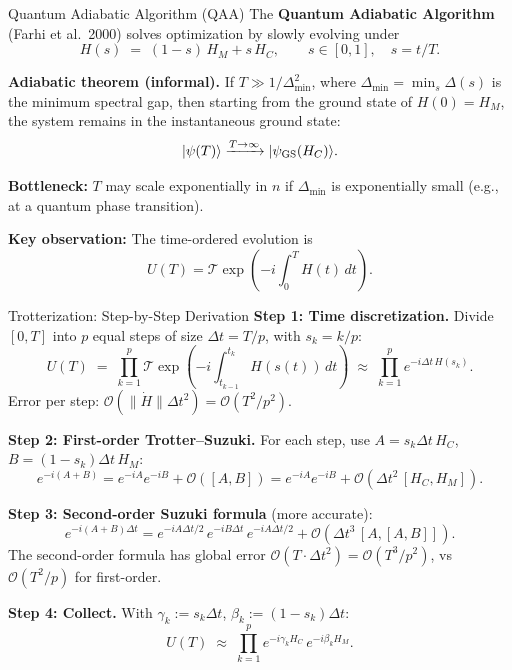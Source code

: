 \documentclass{beamer}
\begin{document}
\begin{frame}{Quantum Adiabatic Algorithm (QAA)}
The \textbf{Quantum Adiabatic Algorithm} (Farhi et al.\ 2000) solves
optimization by slowly evolving under
\[
H(s) \;=\; (1-s)\,H_M + s\,H_C, \qquad s \in [0,1],\quad s = t/T.
\]

\textbf{Adiabatic theorem (informal).}  If $T\gg 1/\Delta_{\min}^2$,
where $\Delta_{\min} = \min_{s}\Delta(s)$ is the minimum spectral gap,
then starting from the ground state of $H(0) = H_M$, the system
remains in the instantaneous ground state:
\[
|\psi(T)\rangle \xrightarrow{T\to\infty} |\psi_{\rm GS}(H_C)\rangle.
\]

\textbf{Bottleneck:} $T$ may scale exponentially in $n$ if
$\Delta_{\min}$ is exponentially small (e.g., at a quantum phase
transition).

\textbf{Key observation:} The time-ordered evolution is
\[
U(T) = \mathcal{T}\exp\!\left(-i\int_0^T H(t)\,dt\right).
\]
\end{frame}


\begin{frame}{Trotterization: Step-by-Step Derivation}
\textbf{Step 1: Time discretization.}
Divide $[0,T]$ into $p$ equal steps of size $\Delta t = T/p$,
with $s_k = k/p$:
\[
U(T) \;=\; \prod_{k=1}^p \mathcal{T}\exp\!\left(
-i\int_{t_{k-1}}^{t_k} H(s(t))\,dt\right)
\;\approx\; \prod_{k=1}^p e^{-i\Delta t\, H(s_k)}.
\]
Error per step: $\mathcal{O}(\|\dot{H}\|\Delta t^2) = \mathcal{O}(T^2/p^2)$.

\medskip

\textbf{Step 2: First-order Trotter--Suzuki.}
For each step, use $A = s_k\Delta t\,H_C$, $B=(1-s_k)\Delta t\,H_M$:
\[
e^{-i(A+B)}
= e^{-iA}e^{-iB} + \mathcal{O}([A,B])
= e^{-iA}e^{-iB} + \mathcal{O}(\Delta t^2\,[H_C,H_M]).
\]

\textbf{Step 3: Second-order Suzuki formula} (more accurate):
\[
e^{-i(A+B)\Delta t}
= e^{-iA\Delta t/2}\,e^{-iB\Delta t}\,e^{-iA\Delta t/2}
+ \mathcal{O}(\Delta t^3\,[A,[A,B]]).
\]
The second-order formula has global error $\mathcal{O}(T\cdot\Delta t^2)
= \mathcal{O}(T^3/p^2)$, vs $\mathcal{O}(T^2/p)$ for first-order.

\textbf{Step 4: Collect.} With $\gamma_k := s_k\Delta t$, $\beta_k := (1-s_k)\Delta t$:
\[
U(T) \;\approx\; \prod_{k=1}^p e^{-i\gamma_k H_C}\,e^{-i\beta_k H_M}.
\]
\end{frame}

\end{document}
